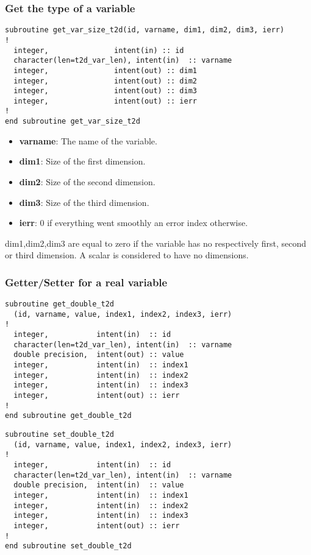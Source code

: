 \subsubsection{Get the type of a variable}
%
\begin{lstlisting}
subroutine get_var_size_t2d(id, varname, dim1, dim2, dim3, ierr)
!
  integer,               intent(in) :: id
  character(len=t2d_var_len), intent(in)  :: varname
  integer,               intent(out) :: dim1
  integer,               intent(out) :: dim2
  integer,               intent(out) :: dim3
  integer,               intent(out) :: ierr
!
end subroutine get_var_size_t2d
\end{lstlisting}
%
\begin{itemize}
\item \textbf{varname}: The name of the variable.
\item \textbf{dim1}: Size of the first dimension.
\item \textbf{dim2}: Size of the second dimension.
\item \textbf{dim3}: Size of the third dimension.
\item \textbf{ierr}: 0 if everything went smoothly an error index otherwise.
\end{itemize}
%
dim1,dim2,dim3 are equal to zero if the variable has no respectively first,
second or third dimension. A scalar is considered to have no dimensions.
%
\subsubsection{Getter/Setter for a real variable}
%
\begin{lstlisting}
subroutine get_double_t2d
  (id, varname, value, index1, index2, index3, ierr)
!
  integer,           intent(in)  :: id
  character(len=t2d_var_len), intent(in)  :: varname
  double precision,  intent(out) :: value
  integer,           intent(in)  :: index1
  integer,           intent(in)  :: index2
  integer,           intent(in)  :: index3
  integer,           intent(out) :: ierr
!        
end subroutine get_double_t2d
\end{lstlisting}

\begin{lstlisting}
subroutine set_double_t2d
  (id, varname, value, index1, index2, index3, ierr)
!
  integer,           intent(in)  :: id
  character(len=t2d_var_len), intent(in)  :: varname
  double precision,  intent(in)  :: value
  integer,           intent(in)  :: index1
  integer,           intent(in)  :: index2
  integer,           intent(in)  :: index3
  integer,           intent(out) :: ierr
!        
end subroutine set_double_t2d
\end{lstlisting}

